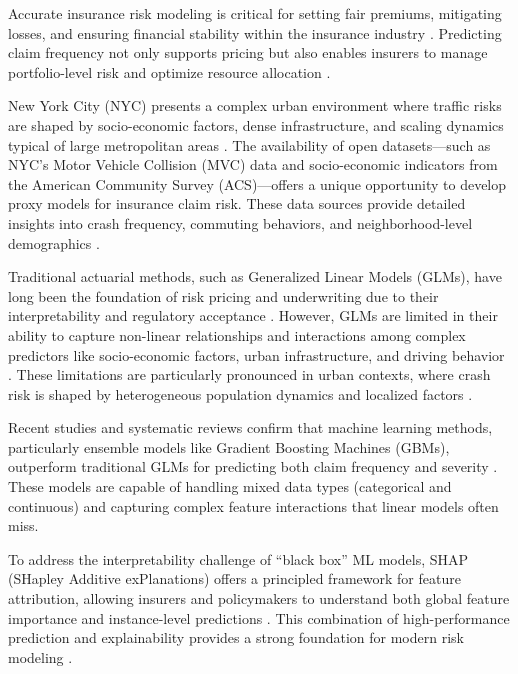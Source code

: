\documentclass[
  number,
  review,
  3p]{elsarticle}
\begin{document}
Accurate insurance risk modeling is critical for setting fair premiums,
mitigating losses, and ensuring financial stability within the insurance
industry \citep{henckaerts, clemente}. Predicting claim frequency not
only supports pricing but also enables insurers to manage
portfolio-level risk and optimize resource allocation \citep{mohamed}.

New York City (NYC) presents a complex urban environment where traffic
risks are shaped by socio-economic factors, dense infrastructure, and
scaling dynamics typical of large metropolitan areas
\citep{cabrera, bettencourt}. The availability of open datasets---such
as NYC's Motor Vehicle Collision (MVC) data and socio-economic
indicators from the American Community Survey (ACS)---offers a unique
opportunity to develop proxy models for insurance claim risk. These data
sources provide detailed insights into crash frequency, commuting
behaviors, and neighborhood-level demographics
\citep{adeniyi, brubacher}.

Traditional actuarial methods, such as Generalized Linear Models (GLMs),
have long been the foundation of risk pricing and underwriting due to
their interpretability and regulatory acceptance \citep{henckaerts}.
However, GLMs are limited in their ability to capture non-linear
relationships and interactions among complex predictors like
socio-economic factors, urban infrastructure, and driving behavior
\citep{clemente}. These limitations are particularly pronounced in urban
contexts, where crash risk is shaped by heterogeneous population
dynamics and localized factors \citep{cabrera, brubacher}.

Recent studies and systematic reviews confirm that machine learning
methods, particularly ensemble models like Gradient Boosting Machines
(GBMs), outperform traditional GLMs for predicting both claim frequency
and severity \citep{clemente, mohamed, behboudi}. These models are
capable of handling mixed data types (categorical and continuous) and
capturing complex feature interactions that linear models often miss.

To address the interpretability challenge of ``black box'' ML models,
SHAP (SHapley Additive exPlanations) offers a principled framework for
feature attribution, allowing insurers and policymakers to understand
both global feature importance and instance-level predictions
\citep{lundberg, dong, ning}. This combination of high-performance
prediction and explainability provides a strong foundation for modern
risk modeling \citep{kim}.
\end{document}
